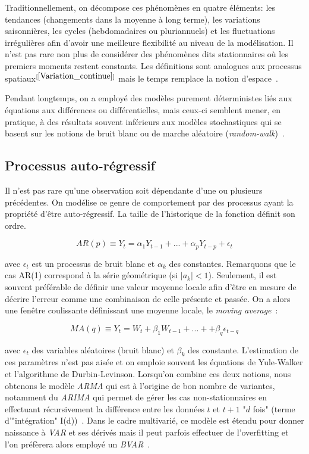 Traditionnellement, on décompose ces phénomènes en quatre éléments: les tendances (changements dans la moyenne à long terme), les variations saisonnières, les cycles (hebdomadaires ou pluriannuels) et les fluctuations irrégulières afin d'avoir une meilleure flexibilité au niveau de la modélisation. Il n'est pas rare non plus de considérer des phénomènes dits stationnaires où les premiers moments restent constants. Les définitions sont analogues aux processus spatiaux$^{[\ref{Variation_continue}]}$ mais le temps remplace la notion d'espace~\cite{chatfield2000time}. 

Pendant longtemps, on a employé des modèles purement déterministes liés aux équations aux différences ou différentielles, mais ceux-ci semblent mener, en pratique, à des résultats souvent inférieurs aux modèles stochastiques qui se basent sur les notions de bruit blanc ou de marche aléatoire (\textit{random-walk})~\cite{chatfield2016analysis}.

\subsection{Processus auto-régressif}\label{AR}

Il n'est pas rare qu'une observation soit dépendante d'une ou plusieurs précédentes. On modélise ce genre de comportement par des processus ayant la propriété d'être auto-régressif. La taille de l'historique de la fonction définit son ordre.

\begin{equation}
    AR(p) \equiv Y_{t} = \alpha_{1} Y_{t - 1} + ... + \alpha_{p} Y_{t - p} + \epsilon_{t}
\end{equation}

avec $ \epsilon_{t} $ est un processus de bruit blanc et $\alpha_{k}$ des constantes. Remarquons que le cas AR(1) correspond à la série géométrique (si $|a_{k}| < 1$). Seulement, il est souvent préférable de définir une valeur moyenne locale afin d'être en mesure de décrire l'erreur comme une combinaison de celle présente et passée. On a alors une fenêtre coulissante définissant une moyenne locale, le \textit{moving average}~\cite{shumway2010time}:

\begin{equation}
    MA(q) \equiv Y_{t} = W_{t} + \beta_{1} W_{t - 1} + ... + + \beta_{q} \epsilon_{t - q}
\end{equation}

avec $\epsilon_{t}$ des variables aléatoires (bruit blanc) et $\beta_{k}$ des constante. L'estimation de ces paramètres n'est pas aisée et on emploie souvent les équations de Yule-Walker et l'algorithme de Durbin-Levinson. Lorsqu'on combine ces deux notions, nous obtenons le modèle \textit{ARMA} qui est à l'origine de bon nombre de variantes, notamment du \textit{ARIMA} qui permet de gérer les cas non-stationnaires en effectuant récursivement la différence entre les données $t$ et $t+1$ "$d$ fois" (terme d'"intégration" I(d))~\cite{box2015time}. Dans le cadre multivarié, ce modèle est étendu pour donner naissance à \textit{VAR} et ses dérivés mais il peut parfois effectuer de l'overfitting et l'on préfèrera alors employé un \textit{BVAR}~\cite{lutkepohl2005new}.

